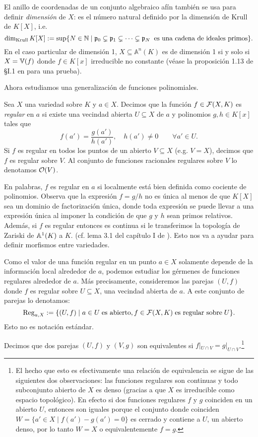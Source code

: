 El anillo de coordenadas de un conjunto algebraico afín también se usa para definir \emph{dimensión} de $X$: es el número natural definido por la dimensión de Krull de $K[X]$, i.e.
\[
	\dim_{\mathrm{Krull}}K[X]:=\sup\{N\in\mathbb{N}\mid \mathfrak{p}_0\subsetneq\mathfrak{p}_1\subsetneq\cdots\subsetneq\mathfrak{p}_N\;\;\text{es una cadena de ideales primos}\}.
\]
En el caso particular de dimensión 1, $X\subseteq\mathbb{A}^n(K)$ es de dimensión 1 si y solo si $X=\mathbb{V}(f)$ donde $f\in K[x]$ irreducible no constante (véase la proposición 1.13 de \S I.1 en \cite{HartshorneAG} para una prueba).

Ahora estudiamos una generalización de funciones polinomiales.

\begin{defin}
	Sea $X$ una variedad sobre $K$ y $a\in X$. Decimos que la función $f\in\mathcal{F}(X,K)$ es \emph{regular} en $a$ si existe una vecindad abierta $U\subseteq X$  de $a$ y polinomios $g,h\in K[x]$  tales que
\[
	f(a')=\frac{g(a')}{h(a')},\quad h(a')\neq0 \qquad\forall a'\in U.
\]
Si $f$ es regular en todos los puntos de un abierto $V\subseteq X$ (e.g. $V=X$), decimos que $f$ es regular sobre $V$. Al conjunto de funciones racionales regulares sobre $V$ lo denotamos $\mathcal{O}(V)$.
\end{defin}

\begin{nota}
En palabras, $f$ es regular en $a$ si localmente está bien definida como cociente de polinomios. Observa que la expresión $f=g/h$ no es única al menos de que $K[X]$ sea un dominio de factorización única, donde toda expresión se puede llevar a una expresión única al imponer la condición de que $g$ y $h$ sean primos relativos. Además, si $f$ es regular entonces es continua si le transferimos la topología de Zariski de $\mathbb{A}^1(K)$ a $K$. (cf. lema 3.1 del capítulo I de \cite{HartshorneAG}). Esto nos va a ayudar para definir morfismos entre variedades.
\end{nota}

Como el valor de una función regular en un punto $a\in X$ solamente depende de la información local alrededor de $a$, podemos estudiar los gérmenes de funciones regulares alrededor de $a$. Más precisamente, consideremos las parejas $(U,f)$ donde $f$ es regular sobre $U\subseteq X$, una vecindad abierta de $a$. A este conjunto de parejas lo denotamos:
\[
	\mathrm{Reg}_{a,X}:=\{(U,f)\mid a\in U\;\text{es abierto}, f\in\mathcal{F}(X,K)\;\text{es regular sobre}\; U\}.
\]
Esto no es notación estándar.

Decimos que dos parejas $(U,f)$ y $(V,g)$ son equivalentes si $f|_{U\cap V}=g|_{U\cap V}$.\footnote{El hecho que esto es efectivamente una relación de equivalencia se sigue de las siguientes dos observaciones: las funciones regulares son continuas y todo subconjunto abierto de $X$ es denso (gracias a que $X$ es irreducible como espacio topológico). En efecto si dos funciones regulares $f$ y $g$ coinciden en un abierto $U$, entonces son iguales porque el conjunto donde coinciden $W=\{a'\in X\mid f(a')-g(a')=0\}$ es cerrado y contiene a $U$, un abierto denso, por lo tanto $W=X$ o equivalentemente $f=g$.}

